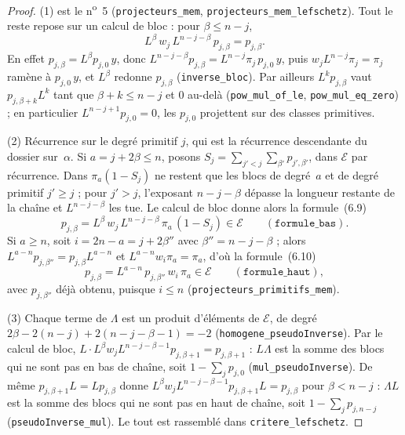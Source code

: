 \begin{proof}
(1) est le n\textsuperscript{o}~5 (\texttt{projecteurs\_mem}, \texttt{projecteurs\_mem\_lefschetz}). Tout le reste repose sur un calcul de bloc : pour $\beta \leqslant n - j$,
\[
L^{\beta}\, w_j\, L^{n-j-\beta}\, p_{j,\beta} = p_{j,\beta}.
\]
En effet $p_{j,\beta} = L^\beta p_{j,0}\, y$, donc $L^{n-j-\beta} p_{j,\beta} = L^{n-j}\pi_j\, p_{j,0}\, y$, puis $w_j L^{n-j} \pi_j = \pi_j$ ramène à $p_{j,0}\,y$, et $L^\beta$ redonne $p_{j,\beta}$ (\texttt{inverse\_bloc}). Par ailleurs $L^k p_{j,\beta}$ vaut $p_{j,\beta+k} L^k$ tant que $\beta + k \leqslant n - j$ et $0$ au-delà (\texttt{pow\_mul\_of\_le}, \texttt{pow\_mul\_eq\_zero}) ; en particulier $L^{n-j+1} p_{j,0} = 0$, les $p_{j,0}$ projettent sur des classes primitives.

(2) Récurrence sur le degré primitif $j$, qui est la récurrence descendante du dossier sur~$\alpha$. Si $a = j + 2\beta \leqslant n$, posons $S_j = \sum_{j' < j}\sum_{\beta'} p_{j',\beta'}$, dans $\mathcal E$ par récurrence. Dans $\pi_a(1 - S_j)$ ne restent que les blocs de degré~$a$ et de degré primitif $j' \geqslant j$ ; pour $j' > j$, l'exposant $n - j - \beta$ dépasse la longueur restante de la chaîne et $L^{n-j-\beta}$ les tue. Le calcul de bloc donne alors la formule~(6.9)
\[
p_{j,\beta} = L^{\beta}\, w_j\, L^{n-j-\beta}\, \pi_a\, (1 - S_j) \in \mathcal E \qquad (\texttt{formule\_bas}).
\]
Si $a \geqslant n$, soit $i = 2n - a = j + 2\beta''$ avec $\beta'' = n - j - \beta$ ; alors $L^{a-n}p_{j,\beta''} = p_{j,\beta}L^{a-n}$ et $L^{a-n} w_i \pi_a = \pi_a$, d'où la formule~(6.10)
\[
p_{j,\beta} = L^{a-n}\, p_{j,\beta''}\, w_i\, \pi_a \in \mathcal E \qquad (\texttt{formule\_haut}),
\]
avec $p_{j,\beta''}$ déjà obtenu, puisque $i \leqslant n$ (\texttt{projecteurs\_primitifs\_mem}).

(3) Chaque terme de $\Lambda$ est un produit d'éléments de $\mathcal E$, de degré $2\beta - 2(n-j) + 2(n-j-\beta-1) = -2$ (\texttt{homogene\_pseudoInverse}). Par le calcul de bloc, $L \cdot L^{\beta} w_j L^{n-j-\beta-1} p_{j,\beta+1} = p_{j,\beta+1}$ : $L\Lambda$ est la somme des blocs qui ne sont pas en bas de chaîne, soit $1 - \sum_j p_{j,0}$ (\texttt{mul\_pseudoInverse}). De même $p_{j,\beta+1} L = L p_{j,\beta}$ donne $L^{\beta} w_j L^{n-j-\beta-1} p_{j,\beta+1} L = p_{j,\beta}$ pour $\beta < n - j$ : $\Lambda L$ est la somme des blocs qui ne sont pas en haut de chaîne, soit $1 - \sum_j p_{j,n-j}$ (\texttt{pseudoInverse\_mul}). Le tout est rassemblé dans \texttt{critere\_lefschetz}.
\end{proof}

